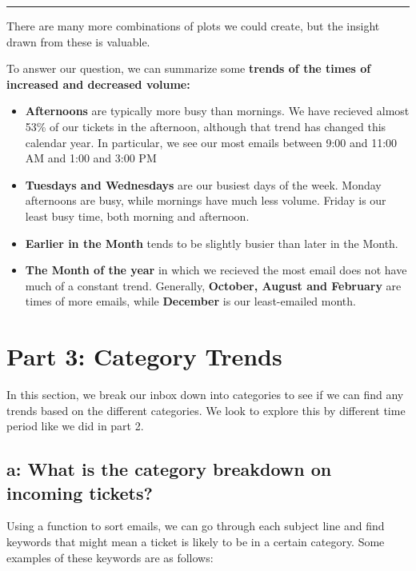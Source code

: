 \documentclass[11pt]{article}
\begin{document}
    \begin{center}\rule{0.5\linewidth}{\linethickness}\end{center}

There are many more combinations of plots we could create, but the
insight drawn from these is valuable.

To answer our question, we can summarize some \textbf{trends of the
times of increased and decreased volume:}

\begin{itemize}
\item
  \textbf{Afternoons} are typically more busy than mornings. We have
  recieved almost 53\% of our tickets in the afternoon, although that
  trend has changed this calendar year. In particular, we see our most
  emails between 9:00 and 11:00 AM and 1:00 and 3:00 PM 
\item
  \textbf{Tuesdays and Wednesdays} are our busiest days of the week.
  Monday afternoons are busy, while mornings have much less volume.
  Friday is our least busy time, both morning and afternoon. 
\item
  \textbf{Earlier in the Month} tends to be slightly busier than later
  in the Month. 
\item
  \textbf{The Month of the year} in which we recieved the most email
  does not have much of a constant trend. Generally, \textbf{October,
  August and February} are times of more emails, while \textbf{December}
  is our least-emailed month.
\end{itemize}

    \hypertarget{part-3-category-trends}{%
\section{Part 3: Category Trends}\label{part-3-category-trends}}

In this section, we break our inbox down into categories to see if we
can find any trends based on the different categories. We look to
explore this by different time period like we did in part 2.

\hypertarget{a-what-is-the-category-breakdown-on-incoming-tickets}{%
\subsection{a: What is the category breakdown on incoming
tickets?}\label{a-what-is-the-category-breakdown-on-incoming-tickets}}

    Using a function to sort emails, we can go through each subject line and
find keywords that might mean a ticket is likely to be in a certain
category. Some examples of these keywords are as follows:
\end{document}
